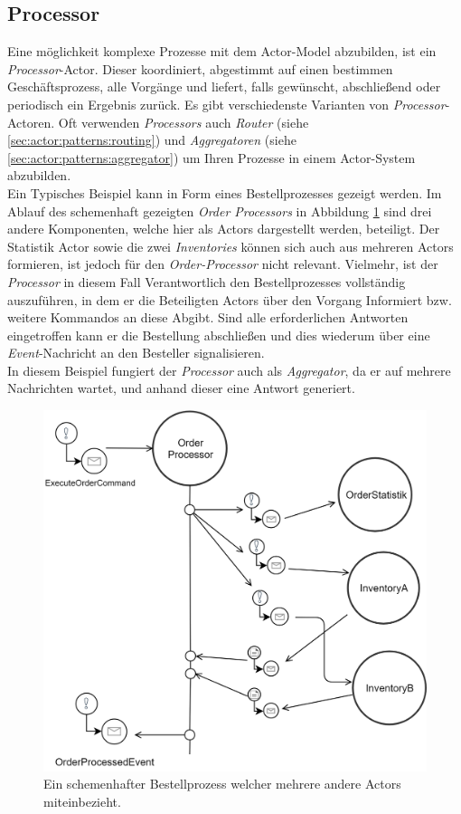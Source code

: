\subsection{Processor}
Eine möglichkeit komplexe Prozesse mit dem Actor-Model abzubilden, ist ein \textit{Processor}-Actor. Dieser koordiniert, abgestimmt auf einen bestimmen Geschäftsprozess, alle Vorgänge und liefert, falls gewünscht, abschließend oder periodisch ein Ergebnis zurück. Es gibt verschiedenste Varianten von \textit{Processor}-Actoren. 
Oft verwenden \textit{Processors} auch \textit{Router} (siehe \ref{sec:actor:patterns:routing}) und \textit{Aggregatoren} (siehe \ref{sec:actor:patterns:aggregator}) um Ihren Prozesse in einem Actor-System abzubilden. \\
Ein Typisches Beispiel kann in Form eines Bestellprozesses gezeigt werden. Im Ablauf des schemenhaft gezeigten \textit{Order Processors} in Abbildung \ref{fig:actor:patterns:orderProcesseor} sind drei andere Komponenten, welche hier als Actors dargestellt werden, beteiligt. Der Statistik Actor sowie die zwei \textit{Inventories} können sich auch aus mehreren Actors formieren, ist jedoch für den \textit{Order-Processor} nicht relevant. Vielmehr, ist der \textit{Processor} in diesem Fall Verantwortlich den Bestellprozesses vollständig auszuführen, in dem er die Beteiligten Actors über den Vorgang Informiert bzw. weitere Kommandos an diese Abgibt. Sind alle erforderlichen Antworten eingetroffen kann er die Bestellung abschließen und dies wiederum über eine \textit{Event}-Nachricht an den Besteller signalisieren. \\
In diesem Beispiel fungiert der \textit{Processor} auch als \textit{Aggregator}, da er auf mehrere Nachrichten wartet, und anhand dieser eine Antwort generiert. 

\begin{figure}
    \centering
    \includegraphics[width=\linewidth]{gfx/actor/patterns/simpleOrderProcesor}
    \caption{Ein schemenhafter Bestellprozess welcher mehrere andere Actors miteinbezieht.}
    \label{fig:actor:patterns:orderProcesseor}
\end{figure}

